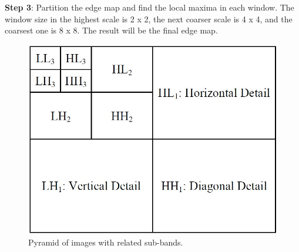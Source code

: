 \noindent\textbf{Step 3}: Partition the edge map and find the local maxima in each window.  
The window size in the highest scale is 2 x 2, the next coarser scale is 4 x 4, and the coarsest one is 8 x 8.  
The result will be the final edge map.

\vspace{5 mm}

\begin{figure}[H] 
  \centering
  \includegraphics[scale=0.3]{pyramidStructure.jpg}  
  \caption{Pyramid of images with related sub-bands. \cite{Tong}} \label{fig:PyraStruc}
\end{figure}

